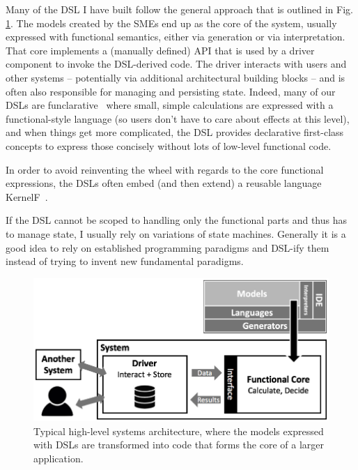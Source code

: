 \documentclass[runningheads]{llncs}
\newcommand{\fig}[1]{Fig. \ref{#1}}  %
\begin{document}
Many of the DSL I have built follow the general approach that is outlined in
\fig{arch}. The models created by the SMEs end up as the core of the system,
usually expressed with functional semantics, either via generation or via
interpretation. That core implements a (manually defined) API that is used by a
driver component to invoke the DSL-derived code. The driver interacts with
users and other systems -- potentially via additional architectural building
blocks -- and is often also responsible for managing and persisting state.
Indeed, many of our DSLs are funclarative~\cite{voelter2018fusing} where small,
simple calculations are expressed with a functional-style language (so users don't
have to care about effects at this level), and when things get more complicated,
the DSL provides declarative first-class concepts to express those concisely
without lots of low-level functional code.

In order to avoid reinventing the wheel with regards to the core functional
expressions, the DSLs often embed (and then extend) a reusable language
KernelF~\cite{volter2018design}.

If the DSL cannot be scoped to handling only the functional parts and thus has
to manage state, I usually rely on variations of state machines. Generally it is
a good idea to rely on established programming paradigms and DSL-ify them
instead of trying to invent new fundamental paradigms.



\begin{figure}[t]
\begin{center}
    \includegraphics[width=1\columnwidth]{figures/arch.png}
    \caption{Typical high-level systems architecture, where the models
    expressed with DSLs are transformed into code that forms the core
    of a larger application.}
    \label{arch}
\end{center} 
\end{figure} 
\end{document}
